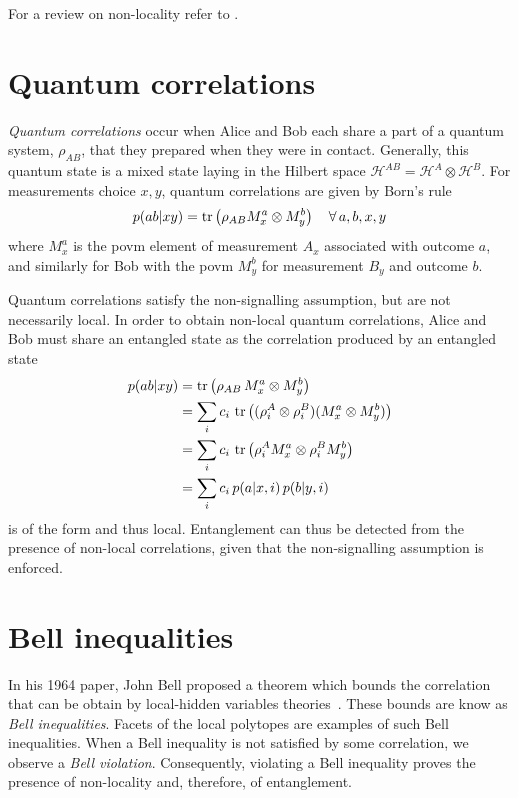 For a review on non-locality refer to \cite{Brunner14}.

\section{Quantum correlations}

\textit{Quantum correlations} occur when Alice and Bob each share a part of a quantum system, $\rho_{AB}$, that they prepared when they were in contact.
Generally, this quantum state is a mixed state laying in the Hilbert space $\mathscr{H}^{AB} = \mathscr{H}^{A} \otimes \mathscr{H}^B$.
For measurements choice $x,y$, quantum correlations are given by Born's rule
\begin{equation}
	p(ab|xy) = \trr{\rho_{AB} M^a_x \otimes M^b_y} \quad \forall\,a,b,x,y
	\label{eq:Born}
\end{equation}
where $M^a_x$ is the \acrfull{povm} element of measurement $A_x$ associated with outcome $a$, and similarly for Bob with the \acrshort{povm} $M^b_y$ for measurement $B_y$ and outcome $b$.

\medbreak

Quantum correlations satisfy the non-signalling assumption, but are not necessarily local.
In order to obtain non-local quantum correlations, Alice and Bob must share an entangled state as the correlation produced by an entangled state
\begin{equation}
	\begin{split}
		p(ab|xy) &= \trr{\rho_{AB} \, M^a_x \otimes M^b_y} \\
				 &= \sum_i c_i\, \trr{(\rho^A_i \otimes \rho^B_i) (M^a_x \otimes M^b_y)} \\
				 &= \sum_i c_i\, \trr{\rho^A_i M^a_x \otimes \rho^B_i M^b_y} \\
				 &= \sum_i c_i\, p(a|x,i)\, p(b|y,i)
	\end{split}
\end{equation}
is of the form  and thus local.
Entanglement can thus be detected from the presence of non-local correlations, given that the non-signalling assumption is enforced.

\section{Bell inequalities}

In his 1964 paper, John Bell proposed a theorem which bounds the correlation that can be obtain by local-hidden variables theories~\cite{Bell1964}.
These bounds are know as \textit{Bell inequalities}.
Facets of the local polytopes are examples of such Bell inequalities.
When a Bell inequality is not satisfied by some correlation, we observe a \textit{Bell violation}.
Consequently, violating a Bell inequality proves the presence of non-locality and, therefore, of entanglement.

